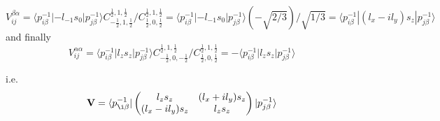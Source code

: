 \documentclass{article}
\begin{document}
\begin{equation}
 V^{\beta\alpha}_{ij}  = \langle p_{i\beta}^{-1}|-l_{-1} s_{0} |p_{j\beta }^{-1}\rangle 
                         C^{\frac 1 2,1,\frac 1 2}_{-\frac 1 2,1,\frac 1 2}/
                         C^{\frac 1 2,1,\frac 1 2}_{\frac 1 2, 0,\frac 1 2}
                       = \langle p_{i\beta}^{-1}|-l_{-1} s_{0} |p_{j\beta }^{-1}\rangle (-\sqrt{2/3})/\sqrt{1/3}
                       = \langle p_{i\beta}^{-1}|(l_x-il_y) s_z |p_{j\beta }^{-1}\rangle
\end{equation}
and finally 
\begin{equation}
 V^{\alpha\alpha}_{ij}  =  \langle p_{i\beta}^{-1}|l_z s_z |p_{j\beta}^{-1}\rangle
                         C^{\frac 1 2,1,\frac 1 2}_{-\frac 1 2, 0,-\frac 1 2}/
                         C^{\frac 1 2,1,\frac 1 2}_{\frac 1 2, 0,\frac 1 2}
 = - \langle p_{i\beta}^{-1}|l_z s_z |p_{j\beta}^{-1}\rangle
\end{equation}

i.e.
\begin{equation}
 \mathbf{V}  =
    \langle 
        p_{\i\beta}^{-1}  |
         \begin{pmatrix} 
            l_z s_z &(l_x + i l_y)s_z \\
            (l_x-il_y)s_z & l_z s_z
        \end{pmatrix}
        | p_{j\beta}^{-1}
    \rangle 
\end{equation}
\end{document}
